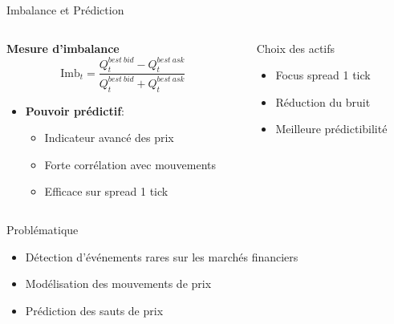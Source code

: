 \documentclass[aspectratio=169]{beamer}  %
\begin{document}
\begin{frame}{Imbalance et Prédiction}
    \begin{columns}
        \begin{column}{0.6\textwidth}
            \textbf{Mesure d'imbalance}
            \begin{equation*}
                \text{Imb}_t = \frac{Q^{best\ bid}_t-Q^{best\ ask}_t}{Q^{best\ bid}_t+Q^{best\ ask}_t}
            \end{equation*}
            \begin{itemize}
                \item \textbf{Pouvoir prédictif}:
                \begin{itemize}
                    \item Indicateur avancé des prix
                    \item Forte corrélation avec mouvements
                    \item Efficace sur spread 1 tick
                \end{itemize}
            \end{itemize}
        \end{column}
        \begin{column}{0.4\textwidth}
            \begin{alertblock}{Choix des actifs}
                \begin{itemize}
                    \item Focus spread 1 tick
                    \item Réduction du bruit
                    \item Meilleure prédictibilité
                \end{itemize}
            \end{alertblock}
        \end{column}
    \end{columns}
\end{frame}

\begin{frame}{Problématique}
    \begin{itemize}
        \item Détection d'événements rares sur les marchés financiers
        \item Modélisation des mouvements de prix
        \item Prédiction des sauts de prix
    \end{itemize}
\end{frame}
\end{document}
